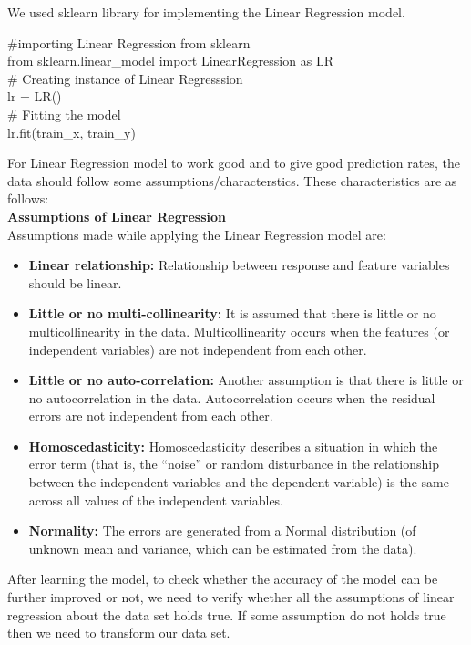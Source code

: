 \documentclass[12pt]{article}
\newenvironment{file}[1][File]{ %
	\medskip
	\newcommand{\mdfilename}{#1}
	\begin{mdframed}[style=file]
}{
	\end{mdframed}
	\medskip
}
\begin{document}
We used sklearn library for implementing the Linear Regression model.
\begin{file}[Linear\_Regression.py]
\#importing Linear Regression from sklearn\\
from sklearn.linear\_model import LinearRegression as LR\\

\# Creating instance of Linear Regresssion\\
lr = LR()\\

\# Fitting the model\\
lr.fit(train\_x, train\_y)
\end{file}



For Linear Regression model to work good and to give good prediction rates, the data should follow some assumptions/characterstics. These characteristics are as follows: \\ 

\textbf{Assumptions of Linear Regression}\\
Assumptions made while applying the Linear Regression model are:
\begin{itemize}
	\item \textbf{Linear relationship:} Relationship between response and feature variables should be linear.
	\item \textbf{Little or no multi-collinearity:} It is assumed that there is little or no multicollinearity in the data. Multicollinearity occurs when the features (or independent variables) are not independent from each other.
	\item \textbf{Little or no auto-correlation:} Another assumption is that there is little or no autocorrelation in the data. Autocorrelation occurs when the residual errors are not independent from each other. 
	\item \textbf{Homoscedasticity:} Homoscedasticity describes a situation in which the error term (that is, the “noise” or random disturbance in the relationship between the independent variables and the dependent variable) is the same across all values of the independent variables. 
	\item \textbf{Normality:} The errors are generated from a Normal distribution (of unknown mean and variance, which can be estimated from the data).
\end{itemize}

After learning the model, to check whether the accuracy of the model can be further improved or not, we need to verify whether all the assumptions of linear regression about the data set holds true. If some assumption do not holds true then we need to transform our data set. 
\end{document}
